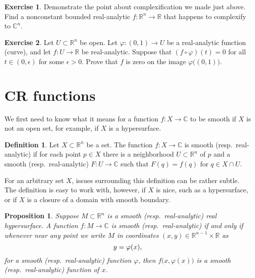 \documentclass[12pt,openany]{book}
\newcommand{\avoidbreak}{\postdisplaypenalty=100}
\newcommand{\C}{{\mathbb{C}}}
\newcommand{\R}{{\mathbb{R}}}
\theoremstyle{plain}
\newtheorem{prop}[thm]{Proposition}
\theoremstyle{remark}
\theoremstyle{definition}
\newtheorem{defn}[thm]{Definition}
\newenvironment{exbox}{%
    \def\FrameCommand{\vrule width 1pt \relax\hspace{10pt}}%
    \MakeFramed{\advance\hsize-\width\FrameRestore}%
}{%
    \endMakeFramed
}
\theoremstyle{exercise}
\newtheorem{exercise}{Exercise}[section]
\theoremstyle{example}
\begin{document}
\begin{exbox}
\begin{exercise}
Demonstrate the point about complexification we made just above.
Find a nonconstant bounded real-analytic $f \colon \R^n \to \R$
that happens to complexify to $\C^n$.
\end{exercise}

\begin{exercise}
Let $U \subset \R^n$ be open.  Let $\varphi \colon (0,1) \to U$ be a
real-analytic function (curve), and let $f \colon U \to \R$ be
real-analytic.  Suppose that $(f \circ \varphi)(t) = 0$ for all $t \in
(0,\epsilon)$ for some $\epsilon > 0$.  Prove that $f$ is zero on the
image $\varphi\bigl((0,1)\bigr)$.
\end{exercise}
\end{exbox}


\section{CR functions}

We first need to know what it means for a function $f \colon X \to \C$
to be smooth if $X$ is not an open set, for example, if $X$ is a hypersurface.

\begin{defn}
Let $X \subset \R^n$ be a set.
The function $f \colon X \to \C$ is smooth (resp.\
real-analytic) if for each point $p \in X$ there is a
neighborhood $U \subset \R^n$ of $p$ and a smooth (resp.\ real-analytic) $F
\colon U \to \C$ such that $F(q) = f(q)$ for $q \in X \cap U$.
\end{defn}

For an arbitrary set $X$, issues surrounding this definition can be
rather subtle.  The definition
is easy to work with,
however, if $X$ is nice, such as a hypersurface, or if $X$ is
a closure of a domain with smooth boundary.

\begin{prop}
Suppose $M \subset \R^n$ is a smooth (resp.\ real-analytic) real hypersurface.
A function $f \colon M \to \C$
is smooth (resp.\ real-analytic) if and only if whenever near any point we write
$M$ in coordinates $(x,y) \in \R^{n-1} \times \R$ as
\begin{equation*}
y = \varphi(x) ,
\avoidbreak
\end{equation*}
for a smooth (resp.\ real-analytic) function $\varphi$, then
$f\bigl(x,\varphi(x)\bigr)$ is a smooth (resp.\ real-analytic) function of $x$.
\end{prop}
\end{document}
